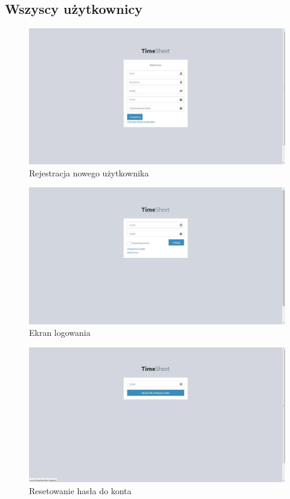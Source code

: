 \documentclass[a4paper, 12pt, oneside]{article}
\begin{document}
		\subsection{Wszyscy użytkownicy}
		\begin{figure}[H]
			\includegraphics[width=16cm]{rejestracja.jpg}
			\caption{Rejestracja nowego użytkownika}
		\end{figure}
		
		\begin{figure}[H]
			\includegraphics[width=16cm]{logowanie.jpg}
			\caption{Ekran logowania}
		\end{figure}
		
		\begin{figure}[H]
			\includegraphics[width=16cm]{reset.jpg}
			\caption{Resetowanie hasła do konta}
		\end{figure}
		
\end{document}

